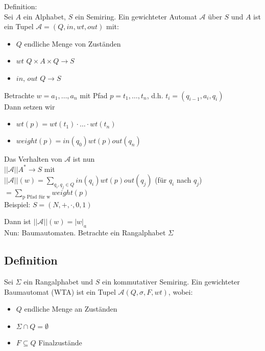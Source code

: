 \documentclass[titlepage]{article}
\begin{document}
Definition:\\
Sei $A$ ein Alphabet, $S$ ein Semiring. Ein gewichteter Automat $\mathcal{A}$ \"uber $S$ und $A$ ist ein Tupel
$\mathcal{A} = (Q, in, wt, out)$ mit:
\begin{itemize}
    \item $Q$ endliche Menge von Zust\"anden
    \item $wt$ $Q \times A \times Q \to S$
    \item $in$, $out$ $Q \to S$
\end{itemize}

Betrachte $w = a_1, \dots, a_n$ mit Pfad $p = t_1, \dots, t_n$, d.h. $t_i = (q_{i-1}, a_i, q_i)$\\
Dann setzen wir
\begin{itemize}
    \item $wt(p) = wt(t_1) \cdot \dots \cdot wt(t_n)$
    \item $weight(p) = in(q_0) wt(p) out(q_n)$
\end{itemize}

Das Verhalten von $\mathcal{A}$ ist nun\\
$||\mathcal{A}|| A^\ast \to S$ mit\\
$||\mathcal{A}|| (w) = \sum\limits_{q_i, q_j \in Q} in(q_i)wt(p)out(q_j)$ (f\"ur $q_i$ nach $q_j$)\\
$=\sum\limits_{\text{p Pfad f\"ur w}} weight(p)$\\

Beispiel: $S = (N,+,\cdot,0,1)$\\

Dann ist $||\mathcal{A}||(w) = |w|_a$\\

Nun: Baumautomaten. Betrachte ein Rangalphabet $\Sigma$

\subsection{Definition}

Sei $\Sigma$ ein Rangalphabet und $S$ ein kommutativer Semiring. Ein gewichteter Baumautomat (WTA) ist
ein Tupel $\mathcal{A}(Q,\sigma,F,wt)$, wobei:
\begin{itemize}
    \item $Q$ endliche Menge an Zust\"anden
    \item $\Sigma \cap Q = \emptyset$
    \item $F \subseteq Q$ Finalzust\"ande
\end{itemize}
\end{document}
